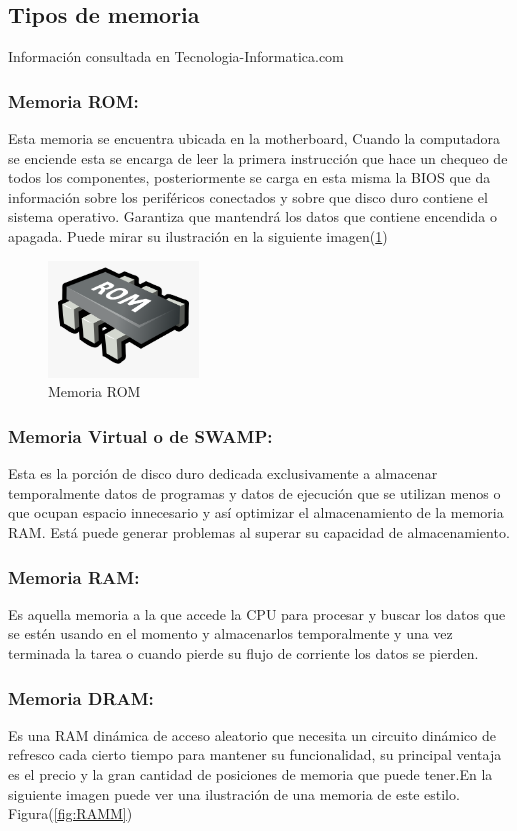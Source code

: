 \documentclass{article}
\begin{document}
\subsection{Tipos de memoria}
Información consultada en    Tecnologia-Informatica.com\cite{TecnologiaInformatica}
\subsubsection{Memoria ROM:}
Esta memoria se encuentra ubicada en la motherboard, Cuando la computadora se enciende esta se encarga de leer la primera instrucción que hace un chequeo de todos los componentes, posteriormente se carga en esta misma la BIOS que da información sobre los periféricos conectados y sobre que disco duro contiene el sistema operativo. Garantiza que mantendrá los datos que contiene encendida o apagada.
Puede mirar su ilustración en la siguiente imagen(\ref{fig:ROM})

\begin{figure}[h]
\includegraphics[width=4cm]{ROM.png}
\centering
\caption{Memoria ROM}
\label{fig:ROM}
\end{figure}
\subsubsection{Memoria Virtual o de SWAMP:}
Esta es la porción de disco duro dedicada exclusivamente a almacenar temporalmente datos de programas y datos de ejecución que se utilizan menos o que ocupan espacio innecesario y así optimizar el almacenamiento de la memoria RAM. Está puede generar problemas al superar su capacidad de almacenamiento.
\subsubsection{Memoria RAM:}
Es aquella memoria a la que accede la CPU para procesar y buscar los datos que se estén usando en el momento y almacenarlos temporalmente y una vez terminada la tarea o cuando pierde su flujo de corriente los datos se pierden.
\subsubsection{Memoria DRAM:}
Es una RAM dinámica de acceso aleatorio que necesita un circuito dinámico de refresco cada cierto tiempo para mantener su funcionalidad, su principal ventaja es el precio y la gran cantidad de posiciones de memoria que puede tener.En la siguiente imagen puede ver una ilustración de una memoria de este estilo. Figura(\ref{fig:RAMM})
\end{document}
